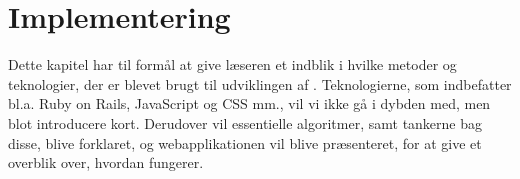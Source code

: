 \chapter{Implementering}
\label{chap:implementering}

Dette kapitel har til formål at give læseren et indblik i hvilke metoder og teknologier, der er blevet brugt til udviklingen af \Foodl. Teknologierne, som indbefatter bl.a. Ruby on Rails, JavaScript og CSS mm., vil vi ikke gå i dybden med, men blot introducere kort. Derudover vil essentielle algoritmer, samt tankerne bag disse, blive forklaret, og webapplikationen vil blive præsenteret, for at give et overblik over, hvordan {\Foodl} fungerer. 




